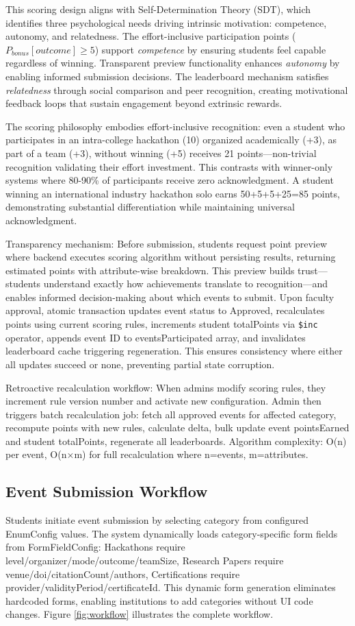 \documentclass[12pt]{article}
\begin{document}
This scoring design aligns with Self-Determination Theory (SDT), which identifies three psychological needs driving intrinsic motivation: competence, autonomy, and relatedness. The effort-inclusive participation points ($P_{bonus}[outcome] \geq 5$) support \textit{competence} by ensuring students feel capable regardless of winning. Transparent preview functionality enhances \textit{autonomy} by enabling informed submission decisions. The leaderboard mechanism satisfies \textit{relatedness} through social comparison and peer recognition, creating motivational feedback loops that sustain engagement beyond extrinsic rewards.

The scoring philosophy embodies effort-inclusive recognition: even a student who participates in an intra-college hackathon (10) organized academically (+3), as part of a team (+3), without winning (+5) receives 21 points—non-trivial recognition validating their effort investment. This contrasts with winner-only systems where 80-90\% of participants receive zero acknowledgment. A student winning an international industry hackathon solo earns 50+5+5+25=85 points, demonstrating substantial differentiation while maintaining universal acknowledgment.

Transparency mechanism: Before submission, students request point preview where backend executes scoring algorithm without persisting results, returning estimated points with attribute-wise breakdown. This preview builds trust—students understand exactly how achievements translate to recognition—and enables informed decision-making about which events to submit. Upon faculty approval, atomic transaction updates event status to Approved, recalculates points using current scoring rules, increments student totalPoints via \texttt{\$inc} operator, appends event ID to eventsParticipated array, and invalidates leaderboard cache triggering regeneration. This ensures consistency where either all updates succeed or none, preventing partial state corruption.

Retroactive recalculation workflow: When admins modify scoring rules, they increment rule version number and activate new configuration. Admin then triggers batch recalculation job: fetch all approved events for affected category, recompute points with new rules, calculate delta, bulk update event pointsEarned and student totalPoints, regenerate all leaderboards. Algorithm complexity: O(n) per event, O(n×m) for full recalculation where n=events, m=attributes.

\subsection{Event Submission Workflow}
Students initiate event submission by selecting category from configured EnumConfig values. The system dynamically loads category-specific form fields from FormFieldConfig: Hackathons require level/organizer/mode/outcome/teamSize, Research Papers require venue/doi/citationCount/authors, Certifications require provider/validityPeriod/certificateId. This dynamic form generation eliminates hardcoded forms, enabling institutions to add categories without UI code changes. Figure \ref{fig:workflow} illustrates the complete workflow.
\end{document}
